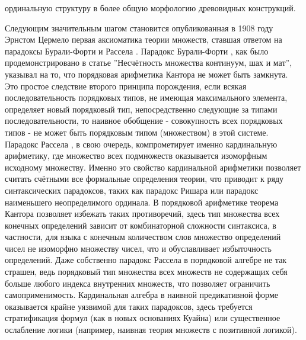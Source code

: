 \documentclass[12pt]{article}
\begin{document}
ординальную структуру в более общую морфологию древовидных конструкций.

Следующим значительным шагом становится опубликованная в 1908 году Эрнстом Цермело первая аксиоматика теории множеств, ставшая ответом на парадоксы Бурали-Форти и Рассела \cite{zermelo-axiomatization}. Парадокс Бурали-Форти \cite{burali-forti-theorem}, как было продемонстрировано в статье ''Несчётность множества континуум, шах и мат'', указывал на то, что порядковая арифметика Кантора не может быть замкнута. Это простое следствие второго принципа порождения, если всякая последовательность порядковых типов, не имеющая максимального элемента, определяет новый порядковый тип, непосредственно следующие за типами последовательности, то наивное обобщение - совокупность всех порядковых типов - не может быть порядковым типом (множеством) в этой системе. Парадокс Рассела \cite{russel-paradox}, в свою очередь, компрометирует именно кардинальную арифметику, где множество всех подмножеств оказывается изоморфным исходному множеству. Именно это свойство кардинальной арифметики позволяет считать счётными все формальные определения теории, что приводит к ряду синтаксических парадоксов, таких как парадокс Ришара или парадокс наименьшего неопределимого ординала. В порядковой арифметике теорема Кантора позволяет избежать таких противоречий, здесь тип множества всех конечных определений зависит от комбинаторной сложности синтаксиса, в частности, для языка с конечным количеством слов множество определений чисел не изоморфно множеству чисел, что и обуславливает избыточность определений. Даже собственно парадокс Рассела в порядковой алгебре не так страшен, ведь порядковый тип множества всех множеств не содержащих себя больше любого индекса внутренних множеств, что позволяет ограничить самоприменимость. Кардинальная алгебра в наивной предикативной форме оказывается крайне уязвимой для таких парадоксов, здесь требуется стратификация формул (как в новых основаниях Куайна) или существенное ослабление логики (например, наивная теория множеств с позитивной логикой). 
\end{document}
